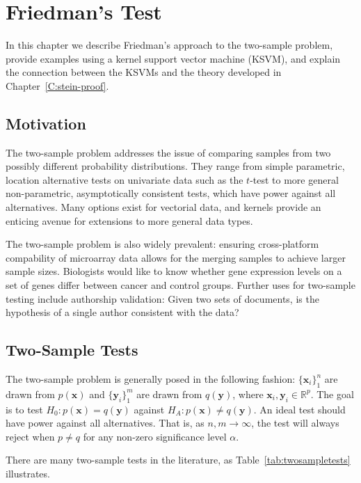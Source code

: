 \graphicspath{{./friedman-test/img/}}
\chapter{Friedman's Test}
\label{C:friedman-test}
In this chapter we describe Friedman's approach to the two-sample
problem, provide examples using a kernel support vector machine (KSVM), and
explain the connection between the KSVMs and the theory developed in
Chapter~\ref{C:stein-proof}.

\section{Motivation}
The two-sample problem addresses the issue of comparing samples from
two possibly different probability distributions.  They range from
simple parametric, location alternative tests on univariate data such as the
$t$-test to more general non-parametric, asymptotically consistent tests, which
have power against all alternatives.  Many options exist for vectorial
data, and kernels provide an enticing avenue for extensions to more
general data types.

The two-sample problem is also widely prevalent: ensuring
cross-platform compability of microarray data allows for the merging
samples to achieve larger sample sizes.  Biologists would like to know
whether gene expression levels on a set of genes differ between cancer
and control groups.  Further uses for two-sample testing include
authorship validation: Given two sets of documents, is the hypothesis
of a single author consistent with the data?

\section{Two-Sample Tests}
The two-sample problem is generally posed in the following fashion: $\{
\mathbf{x}_i\}_1^n$ are drawn from $p(\mathbf{x})$ and
$\{\mathbf{y}_i\}_1^m$ are drawn from $q(\mathbf{y})$, where $\mathbf{x}_i,
\mathbf{y}_i \in \mathbb{R}^p$. The goal is to test $H_0:
p(\mathbf{x}) = q(\mathbf{y})$ against $H_A: p(\mathbf{x}) \neq
q(\mathbf{y})$. An ideal test should have power against all
alternatives. That is, as $n,m \to \infty$, the test
will always reject when $p \neq q$ for any non-zero significance level
$\alpha$.

There are many two-sample tests in the literature, as
Table~\ref{tab:twosampletests} illustrates.

